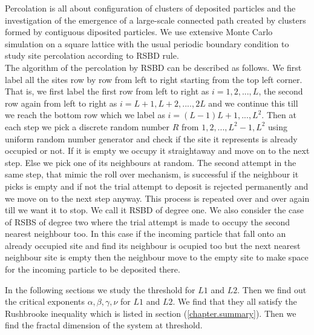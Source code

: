	Percolation is all about configuration of clusters of deposited particles and the investigation of the emergence of a large-scale connected path created by clusters formed by contiguous diposited particles. We use extensive Monte Carlo simulation on a square lattice with the usual periodic boundary condition to study site percolation according to RSBD rule.\\
	
	The algorithm of the percolation by RSBD can be described as follows. We first label all the sites
	row by row from left to right starting from the top left corner. That is, we first label the first row from
	left to right as $i=1,2,...,L$, the second row again from left to right as $i=L+1,L+2,....,2L$
	and we continue this till we reach the bottom row which we label as $i=(L-1)L+1,...,L^2$. 
	Then at each step we pick a discrete random number $R$ from $1,2,...,L^2-1,L^2$ using uniform random number
	generator and check if the site it represents is already occupied or not. If it is
	empty we occupy it straightaway and move on to the next step. Else we pick one of its neighbours at random. 
	The second attempt in the same step, that mimic the roll over mechanism, is successful if the neighbour
	it picks is empty and if not the trial attempt to deposit is rejected permanently and we move on to the next 
	step anyway. This process is
	repeated over and over again till we want it to stop. We call it RSBD of degree one. We also consider
	the case of RSBS of degree two where the trial attempt is made to occupy the second nearest neighbour too.
	In this case if the incoming particle that fall onto an already occupied site and find its 
	neighbour is ocupied too but the next nearest neighbour site is empty then the neighbour move to the empty
	site to make space for the incoming particle to be deposited there. 
	
	In the following sections we study the threshold for $L1$ and $L2$. Then we find out the critical exponents $\alpha, \beta, \gamma, \nu$ for $L1$ and $L2$. We find that they all satisfy the Rushbrooke inequality which is listed in section (\ref{chapter.summary}). Then we find the fractal dimension of the system at threshold.


	\label{sect:finding-numerical-values}
